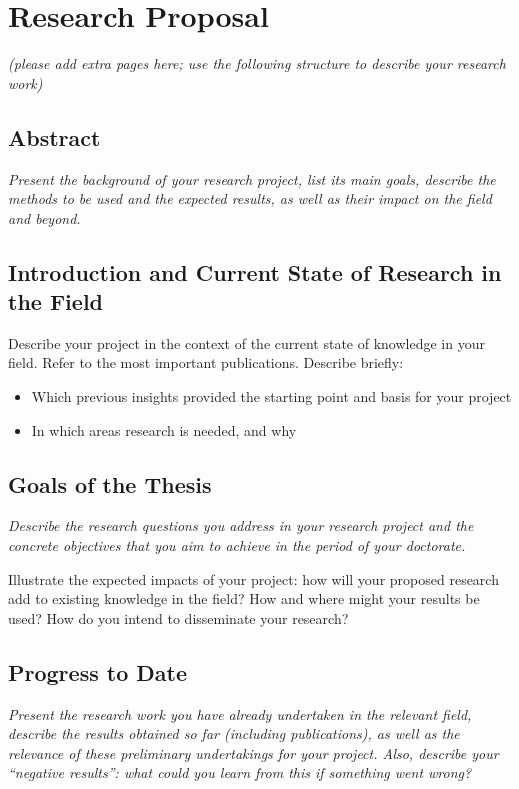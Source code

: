 \documentclass[11pt]{article}
\newcommand{\suggestion}[1]{{\itshape #1}}
\begin{document}


\section{Research Proposal}

\suggestion{(please add extra pages here; use the following structure to describe your research work)}

\subsection{Abstract}
\suggestion{
Present the background of your research project, list its main goals, describe the methods to be used and the expected results, as well as their impact on the field and beyond.

\subsection{Introduction and Current State of Research in the Field}
Describe your project in the context of the current state of knowledge in your field.
Refer to the most important publications.
Describe briefly:
\begin{itemize}
    \item Which previous insights provided the starting point and basis for your project
    \item In which areas research is needed, and why
\end{itemize}
}

\subsection{Goals of the Thesis}
\suggestion{
Describe the research questions you address in your research project and the concrete objectives that you aim to achieve in the period of your doctorate.

Illustrate the expected impacts of your project: how will your proposed research add to existing knowledge in the field?
How and where might your results be used?
How do you intend to disseminate your research?
}

\subsection{Progress to Date}
\suggestion{
Present the research work you have already undertaken in the relevant field, describe the results obtained so far (including publications), as well as the relevance of these preliminary undertakings for your project.
Also, describe your “negative results”: what could you learn from this if something went wrong?
}
\end{document}
